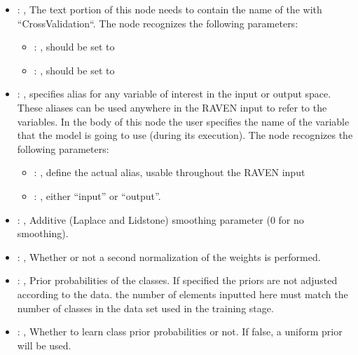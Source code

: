 \begin{itemize}
    \item {}: , 
      The text portion of this node needs to contain the name of the  with
               ``CrossValidation``.
      The  node recognizes the following parameters:
        \begin{itemize}
          \item {}: , 
            should be set to 
          \item {}: , 
            should be set to 
      \end{itemize}

    \item {}: , 
      specifies alias for         any variable of interest in the input or output space. These
      aliases can be used anywhere in the RAVEN input to         refer to the variables. In the body
      of this node the user specifies the name of the variable that the model is going to use
      (during its execution).
      The  node recognizes the following parameters:
        \begin{itemize}
          \item {}: , 
            define the actual alias, usable throughout the RAVEN input
          \item {}: , 
            either ``input'' or ``output''.
      \end{itemize}

    \item {}: , 
      Additive (Laplace and Lidstone) smoothing parameter (0 for no smoothing).

    \item {}: , 
      Whether or not a second normalization of the weights is performed.

    \item {}: , 
      Prior probabilities of the classes. If specified the priors are
      not adjusted according to the data. \nb the number of elements inputted here must
      match the number of classes in the data set used in the training stage.

    \item {}: , 
      Whether to learn class prior probabilities or not. If false, a uniform
      prior will be used.
  \end{itemize}


